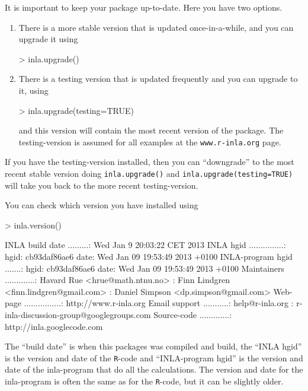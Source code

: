\documentclass[a4paper,11pt]{report}
\newcommand{\tv}{\texttt}
\begin{document}
It is important to keep your package up-to-date. Here you have two
options. 
\begin{enumerate}
\item There is a more stable version that is updated once-in-a-while,
    and you can upgrade it using
\begin{Schunk}
\begin{Sinput}
> inla.upgrade()
\end{Sinput}
\end{Schunk}
\item There is a testing version that is updated frequently and you
    can upgrade to it, using
\begin{Schunk}
\begin{Sinput}
> inla.upgrade(testing=TRUE)
\end{Sinput}
\end{Schunk}
and this version will contain the most recent version of the package.
The testing-version is assumed for all examples at the
\verb|www.r-inla.org| page. 
\end{enumerate}
If you have the testing-version installed, then you can ``downgrade''
to the most recent stable version doing \verb|inla.upgrade()| and
\verb|inla.upgrade(testing=TRUE)| will take you back to the more
recent testing-version. 

You can check which version you have installed using
\begin{Schunk}
\begin{Sinput}
> inla.version()
\end{Sinput}
\begin{Soutput}
	INLA build date .........: Wed Jan  9 20:03:22 CET 2013
	INLA hgid ...............: hgid: cb93daf86ae6  date: Wed Jan 09 19:53:49 2013 +0100
	INLA-program hgid .......: hgid: cb93daf86ae6  date: Wed Jan 09 19:53:49 2013 +0100
	Maintainers .............: Havard Rue <hrue@math.ntnu.no>
	                         : Finn Lindgren <finn.lindgren@gmail.com>
	                         : Daniel Simpson <dp.simpson@gmail.com>
	Web-page ................: http://www.r-inla.org
	Email support ...........: help@r-inla.org
	                         : r-inla-discussion-group@googlegroups.com
	Source-code .............: http://inla.googlecode.com
\end{Soutput}
\end{Schunk}
The ``build date'' is when this packages was compiled and build, the
``INLA hgid'' is the version and date of the \tv{R}-code and 
``INLA-program hgid'' is the version and date of the inla-program that
do all the calculations. The version and date for the inla-program is
often the same as for the \tv{R}-code, but it can be slightly older. 
\end{document}
